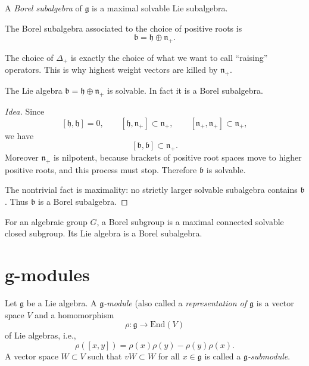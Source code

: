 \begin{definition}
\label{definition-Borel-subalgebra}
A {\it Borel subalgebra} of $\mathfrak{g}$ is
a maximal solvable Lie subalgebra.
\end{definition}

The Borel subalgebra associated to the choice
of positive roots is
$$
\mathfrak{b}
=
\mathfrak{h}\oplus \mathfrak{n}_+.
$$

\begin{remark}
The choice of $\Delta_+$ is exactly the
choice of what we want to call ``raising''
operators. This is why highest weight vectors
are killed by $\mathfrak{n}_+$.
\end{remark}

\begin{proposition}
\label{proposition-standard-Borel}
The Lie algebra
$\mathfrak{b}=\mathfrak{h}\oplus\mathfrak{n}_+$
is solvable. In fact it is a Borel
subalgebra.
\end{proposition}

\begin{proof}[Idea]
Since
$$
[\mathfrak{h},\mathfrak{h}]=0,
\qquad
[\mathfrak{h},\mathfrak{n}_+]\subset
\mathfrak{n}_+,
\qquad
[\mathfrak{n}_+,\mathfrak{n}_+]\subset
\mathfrak{n}_+,
$$
we have
$$
[\mathfrak{b},\mathfrak{b}]
\subset
\mathfrak{n}_+.
$$
Moreover $\mathfrak{n}_+$ is nilpotent,
because brackets of positive root spaces move
to higher positive roots, and this process
must stop. Therefore $\mathfrak{b}$ is
solvable.

The nontrivial fact is maximality: no strictly
larger solvable subalgebra contains
$\mathfrak{b}$. Thus $\mathfrak{b}$ is a
Borel subalgebra.
\end{proof}

\begin{remark}
For an algebraic group $G$, a Borel subgroup
is a maximal connected solvable closed
subgroup. Its Lie algebra is a Borel
subalgebra.
\end{remark}
\section{g-modules}
\label{section-g-modules}

\begin{definition}
\label{definition-g-module}
Let $\mathfrak{g}$ be a Lie algebra. A {\it
$\mathfrak{g}$-module}
(also called a {\it representation of
$\mathfrak{g}$}
is a vector space $V$ and a homomorphism
$$
\rho:\mathfrak{g}\to \text{End}(V)
$$
of Lie algebras, i.e.,
$$
\rho([x,y])=\rho(x)\rho(y)-\rho(y)\rho(x).
$$
A vector space $W \subset V$ such that
$vW\subset W$ for all
$x \in \mathfrak{g}$ is called a
 {\it $\mathfrak{g}$-submodule}.
\end{definition}


